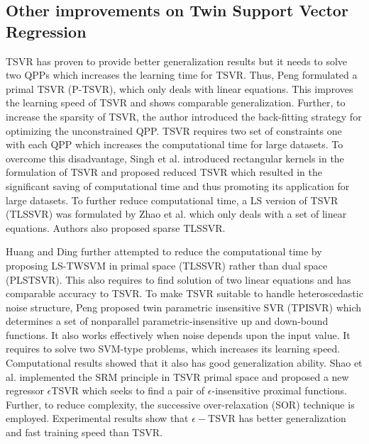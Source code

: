 \documentclass[pdflatex,sn-mathphys]{sn-jnl}%
\theoremstyle{thmstyleone}%
\theoremstyle{thmstyletwo}%
\theoremstyle{thmstylethree}%
\begin{document}
\subsection{Other improvements on Twin Support Vector Regression}

TSVR has proven to provide better generalization results but it needs to solve two QPPs which increases the learning time for TSVR. Thus, Peng \cite{peng2010primal} formulated a primal TSVR (P-TSVR), which only deals with linear equations. This improves the learning speed of TSVR and shows comparable generalization. Further, to increase the sparsity of TSVR, the author introduced the back-fitting strategy for optimizing the unconstrained QPP. TSVR requires two set of constraints one with each QPP which increases the computational time for large datasets. To overcome this disadvantage, Singh et al. \cite{singh2011reduced} introduced rectangular kernels in the formulation of TSVR and proposed reduced TSVR which resulted in the significant saving of computational time and thus promoting its application for large datasets. To further reduce computational time, a LS version of TSVR (TLSSVR) was formulated by Zhao et al. \cite{zhao2013twin} which only deals with a set of linear equations. Authors also proposed sparse TLSSVR.

Huang and Ding \cite{huang2013primal} further attempted to reduce the computational time by proposing LS-TWSVM in primal space (TLSSVR) rather than dual space (PLSTSVR). This also requires to find solution of two linear equations and has comparable accuracy to TSVR. To make TSVR suitable to handle heteroscedastic noise structure, Peng \cite{peng2012efficient} proposed twin parametric insensitive SVR (TPISVR) which determines a set of nonparallel parametric-insensitive up and down-bound functions. It also works effectively when noise depends upon the input value. It requires to solve two SVM-type problems, which increases its learning speed. Computational results showed that it also has good generalization ability. Shao et al. \cite{shao2013varepsilon} implemented the SRM principle in TSVR primal space and proposed a new regressor $\epsilon$\textendash TSVR which seeks to find a pair of $\epsilon$-insensitive proximal functions. Further, to reduce complexity, the successive over-relaxation (SOR) technique is employed. Experimental results show that $\epsilon-$TSVR has better generalization and fast training speed than TSVR. 
\end{document}
